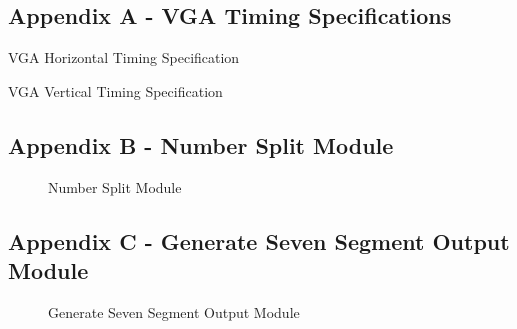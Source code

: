\documentclass[a4paper,12pt]{article}
\begin{document}
\subsection{Appendix A - VGA Timing Specifications}
\begin{flushleft}
\begin{table}[H]
	\centering
	\caption{VGA Horizontal Timing Specification \cite{terasic_2014}}
\end{table}
\begin{table}[H]
	\centering
	\caption{VGA Vertical Timing Specification \cite{terasic_2014}}
\end{table}
\end{flushleft}
\newpage
\subsection{Appendix B - Number Split Module}
\begin{figure}[H]
	\centering
	
		\caption{Number Split Module}
\end{figure}
\newpage
\subsection{Appendix C - Generate Seven Segment Output Module}
\begin{figure}[H]
	\centering
	
		\caption{Generate Seven Segment Output Module}
\end{figure}
\newpage
\end{document}
